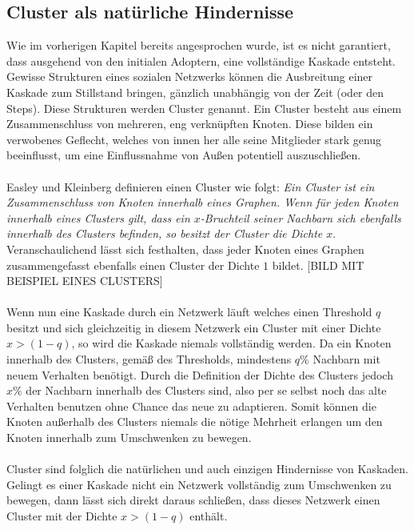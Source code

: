 \documentclass[12pt]{article}
\begin{document}
\subsection{Cluster als natürliche Hindernisse}
\label{ss_cluster}
Wie im vorherigen Kapitel bereits angesprochen wurde, ist es nicht garantiert, dass ausgehend von den initialen Adoptern, eine vollständige Kaskade entsteht. Gewisse Strukturen eines sozialen Netzwerks können die Ausbreitung einer Kaskade zum Stillstand bringen, gänzlich unabhängig von der Zeit (oder den Steps). Diese Strukturen werden Cluster genannt. Ein Cluster besteht aus einem Zusammenschluss von mehreren, eng verknüpften Knoten. Diese bilden ein verwobenes Geflecht, welches von innen her alle seine Mitglieder stark genug beeinflusst, um eine Einflussnahme von Außen potentiell auszuschließen.\\\\
Easley und Kleinberg \cite{Easly10} definieren einen Cluster wie folgt: \emph{Ein Cluster ist ein Zusammenschluss von Knoten innerhalb eines Graphen. Wenn für jeden Knoten innerhalb eines Clusters gilt, dass ein $x$-Bruchteil seiner Nachbarn sich ebenfalls innerhalb des Clusters befinden, so besitzt der Cluster die Dichte $x$}. Veranschaulichend lässt sich festhalten, dass jeder Knoten eines Graphen zusammengefasst ebenfalls einen Cluster der Dichte $1$ bildet.
[BILD MIT BEISPIEL EINES CLUSTERS]\\\\
Wenn nun eine Kaskade durch ein Netzwerk läuft welches einen Threshold $q$ besitzt und sich gleichzeitig in diesem Netzwerk ein Cluster mit einer Dichte $x > (1-q)$, so wird die Kaskade niemals vollständig werden. Da ein Knoten innerhalb des Clusters, gemäß des Thresholds, mindestens $q\%$ Nachbarn mit neuem Verhalten benötigt. Durch die Definition der Dichte des Clusters jedoch $x\%$ der Nachbarn innerhalb des Clusters sind, also per se selbst noch das alte Verhalten benutzen ohne Chance das neue zu adaptieren. Somit können die Knoten außerhalb des Clusters niemals die nötige Mehrheit erlangen um den Knoten innerhalb zum Umschwenken zu bewegen. \\\\
Cluster sind folglich die natürlichen und auch einzigen Hindernisse von Kaskaden. Gelingt es einer Kaskade nicht ein Netzwerk vollständig zum Umschwenken zu bewegen, dann lässt sich direkt daraus schließen, dass dieses Netzwerk einen Cluster mit der Dichte $x > (1-q)$ enthält.

 
\end{document}

